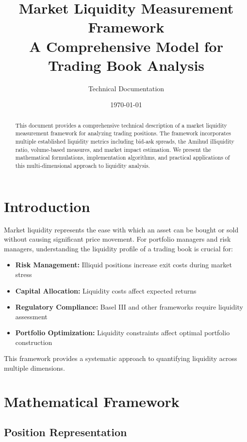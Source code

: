 \documentclass[11pt,a4paper]{article}
\title{\textbf{Market Liquidity Measurement Framework} \\
\large A Comprehensive Model for Trading Book Analysis}
\author{Technical Documentation}
\date{\today}
\begin{document}
\maketitle

\begin{abstract}
This document provides a comprehensive technical description of a market liquidity measurement framework for analyzing trading positions. The framework incorporates multiple established liquidity metrics including bid-ask spreads, the Amihud illiquidity ratio, volume-based measures, and market impact estimation. We present the mathematical formulations, implementation algorithms, and practical applications of this multi-dimensional approach to liquidity analysis.
\end{abstract}

\tableofcontents
\newpage

\section{Introduction}

Market liquidity represents the ease with which an asset can be bought or sold without causing significant price movement. For portfolio managers and risk managers, understanding the liquidity profile of a trading book is crucial for:

\begin{itemize}
    \item \textbf{Risk Management:} Illiquid positions increase exit costs during market stress
    \item \textbf{Capital Allocation:} Liquidity costs affect expected returns
    \item \textbf{Regulatory Compliance:} Basel III and other frameworks require liquidity assessment
    \item \textbf{Portfolio Optimization:} Liquidity constraints affect optimal portfolio construction
\end{itemize}

This framework provides a systematic approach to quantifying liquidity across multiple dimensions.

\section{Mathematical Framework}

\subsection{Position Representation}
\end{document}
